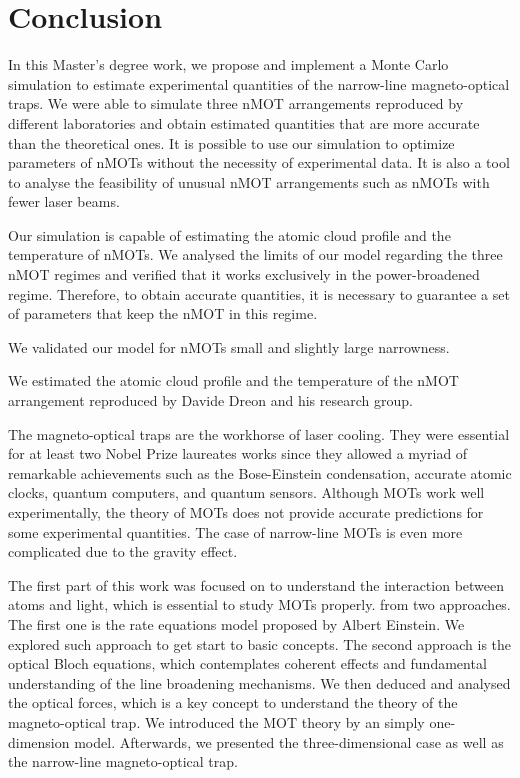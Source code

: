 %
\chapter{Conclusion}
\label{ch:conclusion}
%

In this Master's degree work, we propose and implement a Monte Carlo simulation to estimate experimental quantities of the narrow-line magneto-optical traps.
We were able to simulate three nMOT arrangements reproduced by different laboratories and obtain estimated quantities that are more accurate than the theoretical ones. It is possible to use our simulation to optimize parameters of nMOTs without the necessity of experimental data. It is also a tool to analyse the feasibility of unusual nMOT arrangements such as nMOTs with fewer laser beams.

Our simulation is capable of estimating the atomic cloud profile and the temperature of nMOTs. We analysed the limits of our model regarding the three nMOT regimes and verified that it works exclusively in the power-broadened regime. Therefore, to obtain accurate quantities, it is necessary to guarantee a set of parameters that keep the nMOT in this regime.

We validated our model for nMOTs small and slightly large narrowness.

We estimated the atomic cloud profile and the temperature of the nMOT arrangement reproduced by Davide Dreon and his research group.

The magneto-optical traps are the workhorse of laser cooling. They were essential for at least two Nobel Prize laureates works since they allowed a myriad of remarkable achievements such as the Bose-Einstein condensation, accurate atomic clocks, quantum computers, and quantum sensors. Although MOTs work well experimentally, the theory of MOTs does not provide accurate predictions for some experimental quantities. The case of narrow-line MOTs is even more complicated due to the gravity effect.

The first part of this work was focused on to understand the interaction between atoms and light, which is essential to study MOTs properly. from two approaches. The first one is the rate equations model proposed by Albert Einstein. We explored such approach to get start to basic concepts. The second approach is the optical Bloch equations, which contemplates coherent effects and fundamental understanding of the line broadening mechanisms. We then deduced and analysed the optical forces, which is a key concept to understand the theory of the magneto-optical trap. We introduced the MOT theory by an simply one-dimension model. Afterwards, we presented the three-dimensional case as well as the narrow-line magneto-optical trap.

